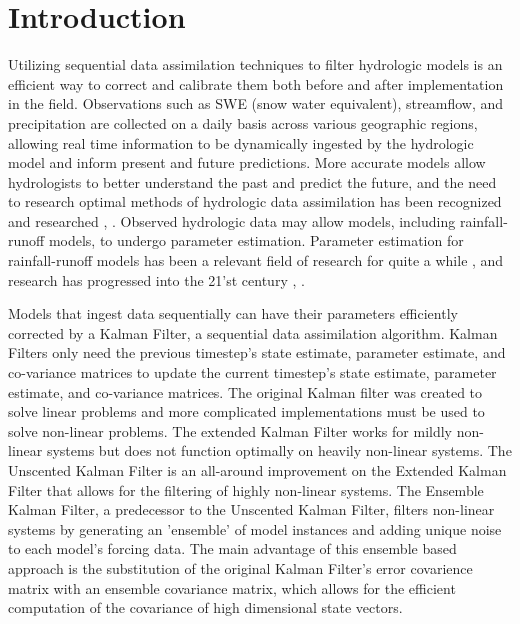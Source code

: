 \chapter{Introduction}



	Utilizing sequential data assimilation techniques to filter hydrologic models is an efficient way to correct and calibrate them both before and after implementation in the field. Observations such as SWE (snow water equivalent), streamflow, and precipitation are collected on a daily basis across various geographic regions, allowing  real time information to be dynamically ingested by the hydrologic model and inform present and future predictions. More accurate models allow hydrologists to better understand the past and predict the future, and the need to research optimal methods of hydrologic data assimilation has been recognized \cite{Troch2003} and researched \cite{Liu2007}, \cite{Reichle2008}. Observed hydrologic data may allow models, including rainfall-runoff models, to undergo parameter estimation. Parameter estimation for rainfall-runoff models has been a relevant field of research for quite a while  \cite{Sorooshian1980},\cite{Sorooshian1993} and research has progressed into the 21'st century \cite{Moradkhani2005}, \cite{Wagener2006}.
	
	Models that ingest data sequentially can have their parameters efficiently corrected by a Kalman Filter, a sequential data assimilation algorithm. Kalman Filters only need the previous timestep's state estimate, parameter estimate, and co-variance matrices to update the current timestep's state estimate, parameter estimate, and co-variance matrices. The original Kalman filter\cite{Kalman1960} was created to solve linear problems and more complicated implementations must be used to solve non-linear problems. The extended Kalman Filter\cite{Jazwinski1970} works for mildly non-linear systems but does not function optimally on heavily non-linear systems\cite{Miller1994}. The Unscented Kalman Filter\cite{Julier1997} is an all-around improvement on the Extended Kalman Filter that allows for the filtering of highly non-linear systems. The Ensemble Kalman Filter\cite{Evensen1994}, a predecessor to the Unscented Kalman Filter, filters non-linear systems by generating an 'ensemble' of model instances and adding unique noise to each model's forcing data. The main advantage of this ensemble based approach is the substitution of the original Kalman Filter's error covarience matrix with an ensemble covariance matrix, which allows for the efficient computation of the covariance of high dimensional state vectors. 
	
